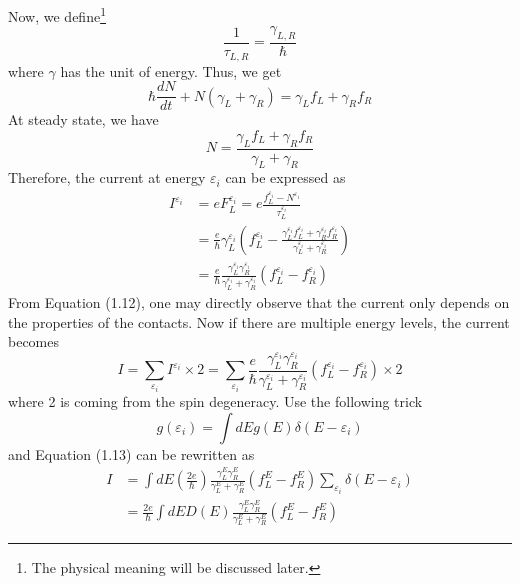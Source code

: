 Now, we define\footnote{The physical meaning will be discussed later.} 
\begin{equation}
\frac{1}{\tau_{L,R}} = \frac{\gamma_{L,R}}{\hbar}
\end{equation} where $\gamma$ has the unit of energy. Thus, we get 
\begin{equation}
\hbar \frac{dN}{dt} + N \left(\gamma_{L}+\gamma_{R}\right) = \gamma_{L} f_{L} + \gamma_{R} f_{R}
\end{equation} 
At steady state, we have 
\begin{equation}
N = \frac{\gamma_{L} f_{L} + \gamma_{R} f_{R}}{\gamma_{L}+\gamma_{R}}
\end{equation} 
Therefore, the current at energy $\varepsilon_i$ can be expressed as 
\begin{align}
I^{\varepsilon_i}&= e F^{\varepsilon_i}_{L} = e \frac{f^{\varepsilon_i}_{L}-N^{\varepsilon_i}}{\tau^{\varepsilon_i}_{L}}\nonumber\\
&=\frac{e}{\hbar} \gamma^{\varepsilon_i}_{L} \left(f^{\varepsilon_i}_{L}-\frac{\gamma^{\varepsilon_i}_{L} f^{\varepsilon_i}_{L} + \gamma^{\varepsilon_i}_{R} f^{\varepsilon_i}_{R}}{\gamma^{\varepsilon_i}_{L}+\gamma^{\varepsilon_i}_{R}}\right)\nonumber\\
&=\frac{e}{\hbar}\frac{\gamma^{\varepsilon_i}_{L}\gamma^{\varepsilon_i}_{R}}{\gamma^{\varepsilon_i}_{L}+\gamma^{\varepsilon_i}_{R}}\left(f^{\varepsilon_i}_{L}-f^{\varepsilon_i}_{R}\right)
\end{align} 
From Equation (1.12), one may directly observe that the current only depends on the properties of the contacts. Now if there are multiple energy levels, the current becomes
\begin{equation}
I = \sum_{\varepsilon_i} I^{\varepsilon_i} \times 2 = \sum_{\varepsilon_i}{\frac{e}{\hbar}\frac{\gamma^{\varepsilon_i}_{L}\gamma^{\varepsilon_i}_{R}}{\gamma^{\varepsilon_i}_{L}+\gamma^{\varepsilon_i}_{R}}\left(f^{\varepsilon_i}_{L}-f^{\varepsilon_i}_{R}\right)}\times2
\end{equation} 
where 2 is coming from the spin degeneracy. Use the following trick 
\begin{equation}
g\left(\varepsilon_i\right) = \int dE g\left(E\right) \delta\left(E-\varepsilon_i\right)
\end{equation} 
and Equation (1.13) can be rewritten as 
\begin{align}
I&= \int dE \left(\frac{2e}{\hbar}\right)\frac{\gamma^{E}_{L}\gamma^{E}_{R}}{\gamma^{E}_{L}+\gamma^{E}_{R}}\left(f^{E}_{L}-f^{E}_{R}\right)\sum_{\varepsilon_i}{\delta\left(E-\varepsilon_i \right)}\nonumber\\
&= \frac{2e}{\hbar}\int dE D\left(E\right) \frac{\gamma^E_{L}\gamma^E_{R}}{\gamma^E_{L}+\gamma^E_{R}} \left(f^E_{L}-f^E_{R}\right)
\end{align} 
